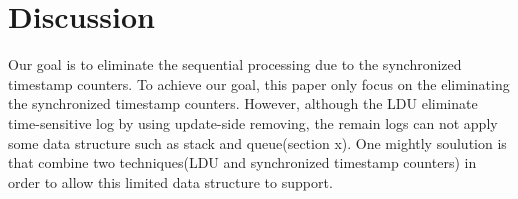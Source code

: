\section{Discussion}

Our goal is to eliminate the sequential processing due to the synchronized
timestamp counters.
To achieve our goal, this paper only focus on the eliminating the synchronized
timestamp counters.
However, although the LDU eliminate time-sensitive log by using update-side
removing, the remain logs can not apply some data structure such as stack and
queue(section x).
One mightly soulution is that combine two techniques(LDU and synchronized
timestamp counters) in order to allow this limited data structure to support.
